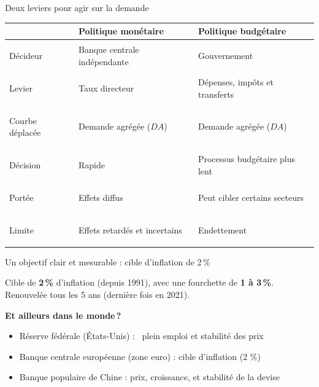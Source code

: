 \documentclass[aspectratio=169]{beamer}
\begin{document}
\begin{frame}{Deux leviers pour agir sur la demande}
   \small
   \renewcommand{\arraystretch}{1.50}
   \begin{tabularx}{\textwidth}{@{}>{\bfseries\raggedright\arraybackslash}p{}JJ@{}}
      \toprule
      & \textbf{Politique monétaire} & \textbf{Politique budgétaire} \\
      \midrule
      Décideur & Banque centrale indépendante & Gouvernement \\
      Levier & Taux directeur & Dépenses, impôts et transferts \\
      Courbe déplacée & Demande agrégée ($DA$) & Demande agrégée ($DA$) \\
      Décision & Rapide & Processus budgétaire plus lent \\
      Portée & Effets diffus & Peut cibler certains secteurs \\
      Limite & Effets retardés et incertains & Endettement \\
      \bottomrule
   \end{tabularx}
\end{frame}

\begin{frame}[t]{Un objectif clair et mesurable : cible d'inflation de 2\,\%}
   \small
   \begin{defbox}
      Cible de \textbf{2\,\%} d'inflation (depuis 1991), avec une fourchette de \textbf{1 à 3\,\%}. Renouvelée tous les 5 ans (dernière fois en 2021).
   \end{defbox}
   \vspace{0.25cm}
   \textbf{Et ailleurs dans le monde\,?}
   \vspace{0.1cm}
   \begin{itemize}
      \setlength\itemsep{0.15cm}
      \item Réserve fédérale (États-Unis) : \guillemotleft~plein emploi et stabilité des prix~\guillemotright
      \item Banque centrale européenne (zone euro) : cible d'inflation (2 \%)
      \item Banque populaire de Chine : prix, croissance, et stabilité de la devise
   \end{itemize}
\end{frame}
\end{document}
